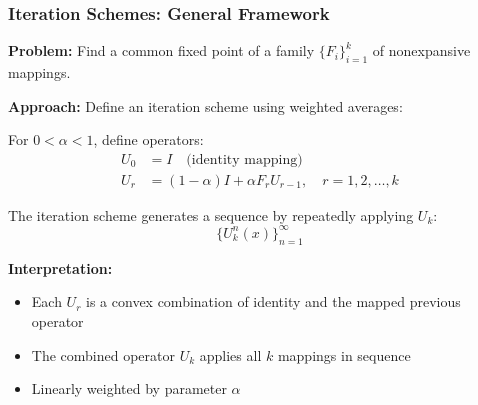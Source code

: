 \documentclass[aspectratio=169,10pt]{beamer}
\begin{document}
\begin{frame}
\frametitle{Iteration Schemes: General Framework}

\textbf{Problem:} Find a common fixed point of a family $\{F_i\}_{i=1}^k$ of nonexpansive mappings.

\vspace{0.3cm}

\textbf{Approach:} Define an iteration scheme using weighted averages:

\vspace{0.15cm}

For $0 < \alpha < 1$, define operators:
\begin{align*}
U_0 &= I \quad \text{(identity mapping)} \\
U_r &= (1-\alpha)I + \alpha F_r U_{r-1}, \quad r = 1, 2, \ldots, k
\end{align*}

\vspace{0.3cm}

The iteration scheme generates a sequence by repeatedly applying $U_k$:
$$\{U_k^n(x)\}_{n=1}^{\infty}$$

\vspace{0.3cm}

\textbf{Interpretation:}
\begin{itemize}
    \item Each $U_r$ is a convex combination of identity and the mapped previous operator
    \item The combined operator $U_k$ applies all $k$ mappings in sequence
    \item Linearly weighted by parameter $\alpha$
\end{itemize}

\end{frame}
\end{document}
